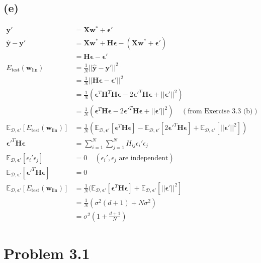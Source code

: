 \documentclass{article}
\begin{document}
	\subsection*{(e)}
		\begin{align*}
			\mathbf y' &= \mathbf X\mathbf w^* + \bm\epsilon'\\
			\hat{\mathbf y} - \mathbf y' &= \mathbf{Xw}^* + \mathbf H\bm\epsilon - (\mathbf{Xw}^* + \bm\epsilon')\\
			&= \mathbf H\bm\epsilon - \bm\epsilon'\\
			E_\text{test}(\mathbf w_{\text{lin}}) &=\frac1N||\hat{\mathbf y} - \mathbf y'||^2\\
			&= \frac1N||\mathbf H\bm\epsilon - \bm\epsilon'||^2\\
			&= \frac1N(\bm\epsilon^T\mathbf H^T\mathbf H\bm\epsilon - 2\bm\epsilon'^T\mathbf H\bm\epsilon + ||\bm\epsilon'||^2)\\
			&= \frac1N(\bm\epsilon^T\mathbf H\bm\epsilon - 2\bm\epsilon'^T\mathbf H\bm\epsilon + ||\bm\epsilon'||^2)\ \ \ \ \ (\text{from Exercise 3.3 (b)})\\
			\mathbb E_{\mathcal D, \bm\epsilon'}[E_\text{test}(\mathbf w_{\text{lin}})] &= \frac1N(\mathbb E_{\mathcal D, \bm\epsilon'}[\bm\epsilon^T\mathbf H\bm\epsilon] - \mathbb E_{\mathcal D, \bm\epsilon'}[2\bm\epsilon'^T\mathbf H\bm\epsilon] + \mathbb E_{\mathcal D, \bm\epsilon'}[||\bm\epsilon'||^2])\\
			\bm\epsilon'^T\mathbf H\bm\epsilon &= \sum\limits_{i=1}^N\sum\limits_{j=1}^NH_{ij}\epsilon_i'\epsilon_j\\
			\mathbb E_{\mathcal D, \bm\epsilon'}[\epsilon_i'\epsilon_j] &= 0\ \ \ \ \ (\epsilon_i', \epsilon_j \text{ are independent})\\
			\mathbb E_{\mathcal D, \bm\epsilon'}[\bm\epsilon'^T\mathbf H\bm\epsilon] &= 0\\
			\mathbb E_{\mathcal D, \bm\epsilon'}[E_\text{test}(\mathbf w_{\text{lin}})] &= \frac1N(\mathbb E_{\mathcal D, \bm\epsilon'}[\bm\epsilon^T\mathbf H\bm\epsilon] + \mathbb E_{\mathcal D, \bm\epsilon'}[||\bm\epsilon'||^2]\\
			&=\frac1N(\sigma^2(d+1) + N\sigma^2)\\
			&= \sigma^2(1 + \frac{d+1}N)
		\end{align*}
		
	\section*{Problem 3.1}
\end{document}
